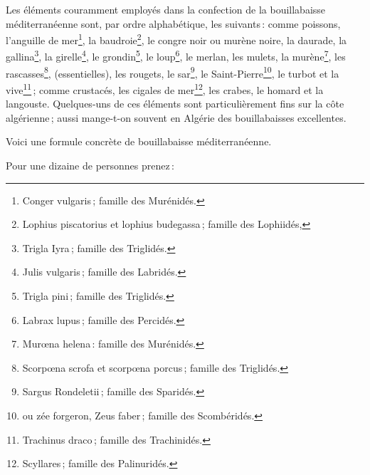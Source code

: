 Les éléments couramment employés dans la confection de la bouillabaisse
méditerranéenne sont, par ordre alphabétique, les suivants : comme poissons,
l'anguille de mer\footnote{Conger vulgaris ; famille des Murénidés.}, la
baudroie\footnote{Lophius piscatorius et lophius budegassa ; famille des
Lophiidés,}, le congre noir ou murène noire, la daurade, la
gallina\footnote{Trigla Iyra ; famille des Triglidés.}, la
girelle\footnote{Julis vulgaris ; famille des Labridés.}, le
grondin\footnote{Trigla pini ; famille des Triglidés.}, le loup\footnote{Labrax
lupus ; famille des Percidés.}, le merlan, les mulets, la
murène\footnote{Murœna helena : famille des Murénidés.}, les
rascasses\footnote{Scorpœna scrofa et scorpœna porcus ; famille des
Triglidés.}, (essentielles), les rougets, le sar\footnote{Sargus Rondeletii ;
famille des Sparidés.}, le Saint-Pierre\footnote{ou zée forgeron, Zeus faber ;
famille des Scombéridés.}, le turbot et la vive\footnote{Trachinus draco ;
famille des Trachinidés.} ; comme crustacés, les cigales de
mer\footnote{Scyllares ; famille des Palinuridés.}, les crabes, le homard et la
langouste. Quelques-uns de ces éléments sont particulièrement fins sur la côte
algérienne ; aussi mange-t-on souvent en Algérie des bouillabaisses excellentes.

Voici une formule concrète de bouillabaisse méditerranéenne.

\medskip

Pour une dizaine de personnes prenez :

\medskip

